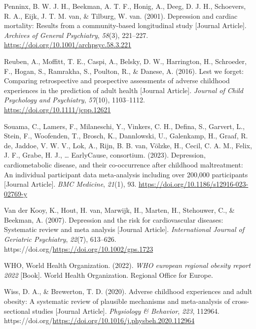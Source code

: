 \documentclass[
  letterpaper,
  DIV=11,
  numbers=noendperiod]{scrreport}
\newlength{\cslhangindent}
\newenvironment{CSLReferences}[2] %
 {\begin{list}{}{%
  \setlength{\itemindent}{0pt}
  \setlength{\leftmargin}{0pt}
  \setlength{\parsep}{0pt}
  \ifodd #1
   \setlength{\leftmargin}{\cslhangindent}
   \setlength{\itemindent}{-1\cslhangindent}
  \fi
  \setlength{\itemsep}{#2\baselineskip}}}
 {\end{list}}
\begin{document}
\begin{CSLReferences}{1}{0}
Penninx, B. W. J. H., Beekman, A. T. F., Honig, A., Deeg, D. J. H.,
Schoevers, R. A., Eijk, J. T. M. van, \& Tilburg, W. van. (2001).
Depression and cardiac mortality: Results from a community-based
longitudinal study {[}Journal Article{]}. \emph{Archives of General
Psychiatry}, \emph{58}(3), 221--227.
\url{https://doi.org/10.1001/archpsyc.58.3.221}

Reuben, A., Moffitt, T. E., Caspi, A., Belsky, D. W., Harrington, H.,
Schroeder, F., Hogan, S., Ramrakha, S., Poulton, R., \& Danese, A.
(2016). Lest we forget: Comparing retrospective and prospective
assessments of adverse childhood experiences in the prediction of adult
health {[}Journal Article{]}. \emph{Journal of Child Psychology and
Psychiatry}, \emph{57}(10), 1103--1112.
\url{https://doi.org/10.1111/jcpp.12621}

Souama, C., Lamers, F., Milaneschi, Y., Vinkers, C. H., Defina, S.,
Garvert, L., Stein, F., Woofenden, T., Brosch, K., Dannlowski, U.,
Galenkamp, H., Graaf, R. de, Jaddoe, V. W. V., Lok, A., Rijn, B. B. van,
Völzke, H., Cecil, C. A. M., Felix, J. F., Grabe, H. J., \ldots{}
EarlyCause, consortium. (2023). Depression, cardiometabolic disease, and
their co-occurrence after childhood maltreatment: An individual
participant data meta-analysis including over 200,000 participants
{[}Journal Article{]}. \emph{BMC Medicine}, \emph{21}(1), 93.
\url{https://doi.org/10.1186/s12916-023-02769-y}

Van der Kooy, K., Hout, H. van, Marwijk, H., Marten, H., Stehouwer, C.,
\& Beekman, A. (2007). Depression and the risk for cardiovascular
diseases: Systematic review and meta analysis {[}Journal Article{]}.
\emph{International Journal of Geriatric Psychiatry}, \emph{22}(7),
613--626. https://doi.org/\url{https://doi.org/10.1002/gps.1723}

WHO, World Health Organization. (2022). \emph{WHO european regional
obesity report 2022} {[}Book{]}. World Health Organization. Regional
Office for Europe.

Wiss, D. A., \& Brewerton, T. D. (2020). Adverse childhood experiences
and adult obesity: A systematic review of plausible mechanisms and
meta-analysis of cross-sectional studies {[}Journal Article{]}.
\emph{Physiology \& Behavior}, \emph{223}, 112964.
https://doi.org/\url{https://doi.org/10.1016/j.physbeh.2020.112964}


\end{CSLReferences}
\end{document}
